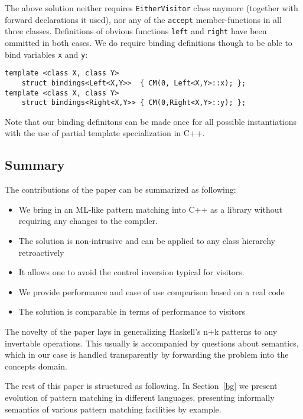 \documentclass[preprint]{sigplanconf}
\DeclareRobustCommand{\code}[1]{{\lstinline[breaklines=false]{#1}}}
\begin{document}
The above solution neither requires \code{EitherVisitor} class anymore (together 
with forward declarations it used), nor any of the \code{accept} 
member-functions in all three classes. Definitions of obvious functions 
\code{left} and \code{right} have been ommitted in both cases. We do require 
binding definitions though to be able to bind variables \code{x} and \code{y}:

\begin{lstlisting}[keepspaces,columns=flexible]
template <class X, class Y> 
    struct bindings<Left<X,Y>>  { CM(0, Left<X,Y>::x); };
template <class X, class Y> 
    struct bindings<Right<X,Y>> { CM(0,Right<X,Y>::y); };
\end{lstlisting}

Note that our binding definitons can be made once for all possible 
instantiations with the use of partial template specialization in C++. 

\subsection{Summary}

The contributions of the paper can be summarized as following:

\begin{itemize}
\item We bring in an ML-like pattern matching into C++ as a library without 
      requiring any changes to the compiler.
\item The solution is non-intrusive and can be applied to any class hierarchy retroactively
\item It allows one to avoid the control inversion typical for visitors.
\item We provide performance and ease of use comparison based on a real code
\item The solution is comparable in terms of performance to visitors
\end{itemize}

The novelty of the paper lays in generalizing Haskell's n+k patterns to any 
invertable operations. This usually is accompanied by questions about semantics, 
which in our case is handled transparently by forwarding the problem into the 
concepts domain.

The rest of this paper is structured as following. In Section~\ref{bg} we 
present evolution of pattern matching in different languages, presenting 
informally semantics of various pattern matching facilities by example.
\end{document}
